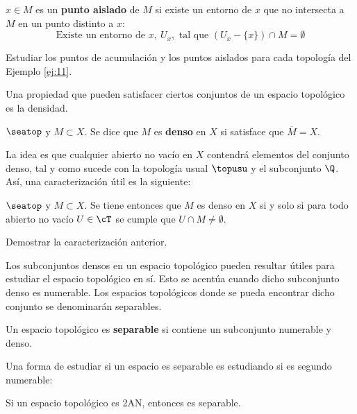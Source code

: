 \begin{deff}
    $x\in M$ es un {\bf punto aislado} de $M$ si existe un entorno de $x$ que no intersecta a $M$ en un punto distinto a $x$:
    \[\text{Existe un entorno de } x, \ U_x, \text{ tal que } (U_x -\{x\}) \cap M = \emptyset \]
\end{deff}

\begin{ex}
    Estudiar los puntos de acumulación y los puntos aislados para cada topología del Ejemplo \ref{ej:11}.
\end{ex}


Una propiedad que pueden satisfacer ciertos conjuntos de un espacio topológico es la densidad.

\begin{deff}
    $\seatop$ y $M\subset X$. Se dice que $M$ es {\bf denso} en $X$ si satisface que $\overline{M} = X$.
\end{deff}

La idea es que cualquier abierto no vacío en $X$ contendrá elementos del conjunto denso, tal y como sucede con la topología usual $\topusu$ y el subconjunto $\Q$. Así, una caracterización útil es la siguiente:

\begin{prop}
    $\seatop$ y $M\subset X$. Se tiene entonces que $M$ es denso en $X$ si y solo si para todo abierto no vacío $U\in\cT$ se cumple que \(U \cap M \neq \emptyset\).
\end{prop}

\begin{ex}
    Demostrar la caracterización anterior.
\end{ex}

Los subconjuntos densos en un espacio topológico pueden resultar útiles para estudiar el espacio topológico en sí. Esto se acentúa cuando dicho subconjunto denso es numerable. Los espacios topológicos donde se pueda encontrar dicho conjunto se denominarán separables.

\begin{deff}
    Un espacio topológico es {\bf separable} si contiene un subconjunto numerable y denso.
\end{deff}

Una forma de estudiar si un espacio es separable es estudiando si es segundo numerable:

\begin{prop}
    Si un espacio topológico es 2AN, entonces es separable.
\end{prop}

